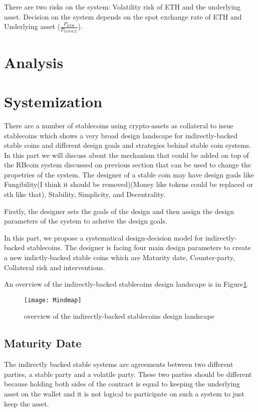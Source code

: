 There are two risks on the system: Volatility risk of ETH and the underlying asset. Decision on the system depends on the spot exchange rate of ETH and Underlying asset
($\frac{P_{ETH}}{P_{GOOGL}} $).


\section{Analysis}



\section{Systemization}
There are a number of stablecoins using crypto-assets as collateral to issue stablecoins which shows a very broad design landscape for indirectly-backed stable coins and different design goals and strategies behind stable coin systems. In this part we will discuss about the mechanism that could be added on top of the RBcoin system discussed on previous section that can be used to change the propetries of the system. The designer of a stable coin may have design goals like Fungibility(I think it should be removed)(Money like tokens could be replaced or sth like that), Stability, Simplicity, and Decentrality. 

Firstly, the designer sets the goals of the design and then assign the design parameters of the system to acheive the design goals.

In this part, we propose a systematical design-decision model for indirectly-backed stablecoins. The designer is facing four main design parameters to create a new indictly-backed stable coins which are Maturity date, Counter-party, Collateral risk and interventions. 



An overview of the indirectly-backed stablecoins design landscape is in Figure\ref{land}.

\begin{figure} 
\centering
\texttt{[image: Mindmap]}
\caption{overview of the indirectly-backed stablecoins design landscape}
\label{land}
\end{figure}

\subsection{Maturity Date}
The indirectly backed stable systems are agreements between two different parties, a stable party and a volatile party. These two parties should be different because holding both sides of the contract is equal to keeping the underlying asset on the wallet and it is not logical to participate on such a system to just keep the asset.

